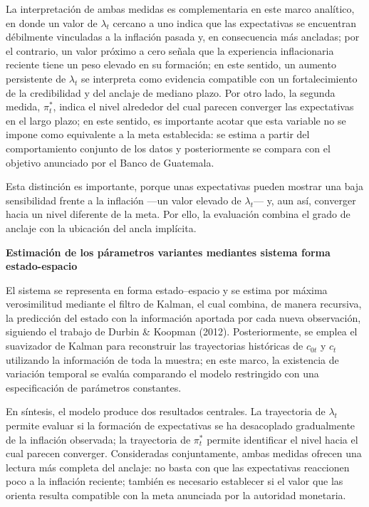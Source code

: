 \documentclass[
  10.5pt,
  letterpaper,
  twocolumn]{article}
\begin{document}
La interpretación de ambas medidas es complementaria en este marco
analítico, en donde un valor de \(\lambda_t\) cercano a uno indica que
las expectativas se encuentran débilmente vinculadas a la inflación
pasada y, en consecuencia más ancladas; por el contrario, un valor
próximo a cero señala que la experiencia inflacionaria reciente tiene un
peso elevado en su formación; en este sentido, un aumento persistente de
\(\lambda_t\) se interpreta como evidencia compatible con un
fortalecimiento de la credibilidad y del anclaje de mediano plazo. Por
otro lado, la segunda medida, \(\pi_t^{*}\), indica el nivel alrededor
del cual parecen converger las expectativas en el largo plazo; en este
sentido, es importante acotar que esta variable no se impone como
equivalente a la meta establecida: se estima a partir del comportamiento
conjunto de los datos y posteriormente se compara con el objetivo
anunciado por el Banco de Guatemala.

Esta distinción es importante, porque unas expectativas pueden mostrar
una baja sensibilidad frente a la inflación ---un valor elevado de
\(\lambda_t\)--- y, aun así, converger hacia un nivel diferente de la
meta. Por ello, la evaluación combina el grado de anclaje con la
ubicación del ancla implícita.

\textbf{Estimación de los párametros variantes mediantes sistema forma
estado-espacio}

El sistema se representa en forma estado--espacio y se estima por máxima
verosimilitud mediante el filtro de Kalman, el cual combina, de manera
recursiva, la predicción del estado con la información aportada por cada
nueva observación, siguiendo el trabajo de Durbin \& Koopman (2012).
Posteriormente, se emplea el suavizador de Kalman para reconstruir las
trayectorias históricas de \(c_{0t}\) y \(c_t\) utilizando la
información de toda la muestra; en este marco, la existencia de
variación temporal se evalúa comparando el modelo restringido con una
especificación de parámetros constantes.

En síntesis, el modelo produce dos resultados centrales. La trayectoria
de \(\lambda_t\) permite evaluar si la formación de expectativas se ha
desacoplado gradualmente de la inflación observada; la trayectoria de
\(\pi_t^{*}\) permite identificar el nivel hacia el cual parecen
converger. Consideradas conjuntamente, ambas medidas ofrecen una lectura
más completa del anclaje: no basta con que las expectativas reaccionen
poco a la inflación reciente; también es necesario establecer si el
valor que las orienta resulta compatible con la meta anunciada por la
autoridad monetaria.
\end{document}
